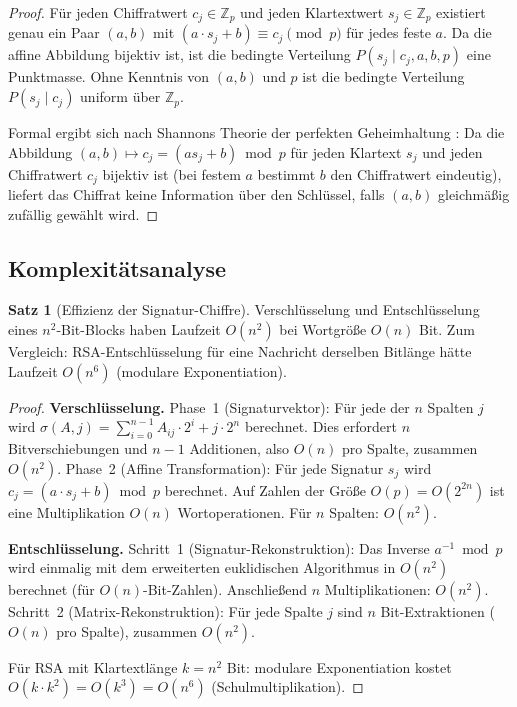 ﻿\documentclass[a4paper,12pt]{article}
\theoremstyle{definition}
\newtheorem{satz}{Satz}[section]
\begin{document}
\begin{proof}
Für jeden Chiffratwert $c_j \in \mathbb{Z}_p$ und jeden Klartextwert $s_j \in \mathbb{Z}_p$
existiert genau ein Paar $(a, b)$ mit $(a \cdot s_j + b) \equiv c_j \pmod{p}$
für jedes feste $a$. Da die affine Abbildung bijektiv ist, ist die bedingte
Verteilung $P(s_j \mid c_j, a, b, p)$ eine Punktmasse. Ohne Kenntnis von $(a, b)$
und $p$ ist die bedingte Verteilung $P(s_j \mid c_j)$ uniform über $\mathbb{Z}_p$.

Formal ergibt sich nach Shannons Theorie der perfekten Geheimhaltung \cite{Sha49}:
Da die Abbildung $(a, b) \mapsto c_j = (a s_j + b)\bmod p$ für jeden Klartext $s_j$
und jeden Chiffratwert $c_j$ bijektiv ist (bei festem $a$ bestimmt $b$ den
Chiffratwert eindeutig), liefert das Chiffrat keine Information über den Schlüssel,
falls $(a, b)$ gleichmäßig zufällig gewählt wird.
\end{proof}

\subsection{Komplexitätsanalyse}

\begin{satz}[Effizienz der Signatur-Chiffre]
\label{satz:pqc-kompl}
Verschlüsselung und Entschlüsselung eines $n^2$-Bit-Blocks haben Laufzeit
$O(n^2)$ bei Wortgröße $O(n)$ Bit.
Zum Vergleich: RSA-Entschlüsselung für eine Nachricht derselben Bitlänge
hätte Laufzeit $O(n^6)$ (modulare Exponentiation).
\end{satz}

\begin{proof}
\textbf{Verschlüsselung.}
Phase~1 (Signaturvektor): Für jede der $n$ Spalten $j$ wird
$\sigma(A,j) = \sum_{i=0}^{n-1} A_{ij} \cdot 2^i + j \cdot 2^n$ berechnet.
Dies erfordert $n$ Bitverschiebungen und $n-1$ Additionen, also $O(n)$ pro Spalte,
zusammen $O(n^2)$.
Phase~2 (Affine Transformation): Für jede Signatur $s_j$ wird
$c_j = (a \cdot s_j + b) \bmod p$ berechnet. Auf Zahlen der Größe $O(p) = O(2^{2n})$
ist eine Multiplikation $O(n)$ Wortoperationen. Für $n$ Spalten: $O(n^2)$.

\textbf{Entschlüsselung.}
Schritt~1 (Signatur-Rekonstruktion): Das Inverse $a^{-1} \bmod p$ wird einmalig
mit dem erweiterten euklidischen Algorithmus in $O(n^2)$ berechnet (für
$O(n)$-Bit-Zahlen). Anschließend $n$ Multiplikationen: $O(n^2)$.
Schritt~2 (Matrix-Rekonstruktion): Für jede Spalte $j$ sind $n$ Bit-Extraktionen
($O(n)$ pro Spalte), zusammen $O(n^2)$.

Für RSA mit Klartextlänge $k = n^2$ Bit: modulare Exponentiation kostet
$O(k \cdot k^2) = O(k^3) = O(n^6)$ (Schulmultiplikation).
\end{proof}
\end{document}
